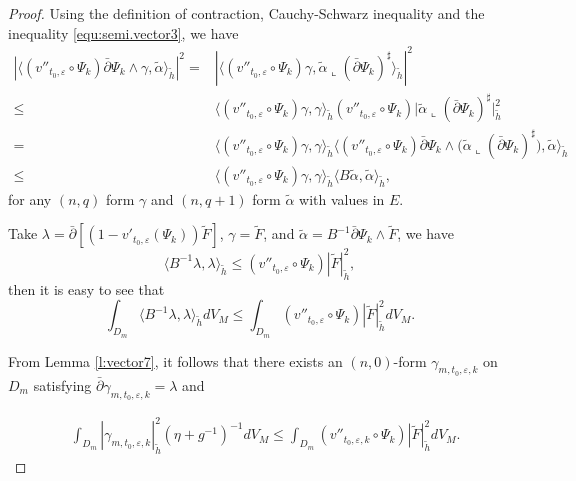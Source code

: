\begin{proof}
Using the definition of contraction, Cauchy-Schwarz inequality and
the inequality \ref{equ:semi.vector3}, we have
\begin{equation}
\label{}
\begin{split}
|\langle (v''_{t_{0},\varepsilon}\circ \Psi_k)\bar\partial\Psi_k\wedge \gamma,\tilde{\alpha}\rangle_{\tilde{h}}|^{2}
=&|\langle (v''_{t_{0},\varepsilon}\circ \Psi_k) \gamma,\tilde{\alpha}\llcorner(\bar\partial\Psi_k)^\sharp\big
\rangle_{\tilde{h}}|^{2}
\\\leq&\langle( v''_{t_{0},\varepsilon}\circ \Psi_k) \gamma,\gamma\rangle_{\tilde{h}}
(v''_{t_{0},\varepsilon}\circ \Psi_k)|\tilde{\alpha}\llcorner(\bar\partial\Psi_k)^\sharp\big|_{\tilde{h}}^{2}
\\=&\langle (v''_{t_{0},\varepsilon}\circ \Psi_k) \gamma,\gamma\rangle_{\tilde{h}}
\langle (v''_{t_{0},\varepsilon}\circ \Psi_k) \bar\partial\Psi_k\wedge
(\tilde{\alpha}\llcorner(\bar\partial\Psi_k)^\sharp\big ),\tilde{\alpha}\rangle_{\tilde{h}}
\\\leq&\langle (v''_{t_{0},\varepsilon}\circ \Psi_k )\gamma,\gamma\rangle_{\tilde{h}}
\langle B\tilde{\alpha},\tilde{\alpha}\rangle_{\tilde{h}},
\end{split}
\end{equation}
for any $(n,q)$ form $\gamma$ and $(n,q+1)$ form $\tilde{\alpha}$ with values in $E$.

Take $\lambda=\bar{\partial}[(1-v'_{t_0,\varepsilon}(\Psi_k)){\tilde{F}}]$, $\gamma=\tilde{F}$, and
$\tilde{\alpha}=B^{-1}\bar\partial\Psi_k\wedge \tilde{F}$,
we have
$$\langle B^{-1}\lambda,\lambda\rangle_{\tilde{h}} \leq (v''_{t_0,\varepsilon}\circ{\Psi_k})| \tilde{F}|^2_{\tilde{h}},$$
 then it is easy to see that
 $$\int_{D_m}\langle B^{-1}\lambda,\lambda\rangle_{\tilde{h}} dV_{M}
 \leq \int_{D_m}(v''_{t_0,\varepsilon}\circ{\Psi_k})| \tilde{F}|^2_{\tilde{h}}dV_{M}.$$

From Lemma \ref{l:vector7}, it follows that there exists an
$(n,0)$-form $\gamma_{m,t_0,\varepsilon,k}$ on $D_{m}$ satisfying
$\bar{\partial}\gamma_{m,t_0,\varepsilon,k}=\lambda$ and

\begin{equation}
 \label{equ:semi.vector3.2}
 \begin{split}
 &\int_{ D_m}|\gamma_{m,t_0,\varepsilon,k}|^{2}_{\tilde{h}}(\eta+g^{-1})^{-1}dV_{M}
  \leq\int_{D_m}(v''_{t_0,\varepsilon,k}\circ{\Psi_{k}})| \tilde{F}|^2_{\tilde{h}}dV_M.
  \end{split}
\end{equation}


\end{proof}
